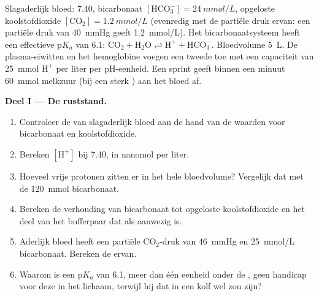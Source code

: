 \begin{problem}
\label{pb:b1:water-small-molecules:1}
Slagaderlijk bloed:  7.40, bicarbonaat $[\mathrm{HCO_3^-}] =
\qty{24}{mmol/L}$, opgeloste koolstofdioxide $[\mathrm{CO_2}] =
\qty{1.2}{mmol/L}$ (evenredig met de partiële druk ervan: een partiële druk van
\qty{40}{mmHg} geeft \qty{1.2}{mmol/L}). Het bicarbonaatsysteem heeft een
effectieve p$K_a$ van 6.1: $\mathrm{CO_2} + \mathrm{H_2O}
\rightleftharpoons \mathrm{H^+} + \mathrm{HCO_3^-}$. Bloedvolume \qty{5}{L}. De
plasma-eiwitten en het hemoglobine voegen een tweede  toe met een
capaciteit van \qty{25}{mmol} $\mathrm{H^+}$ per liter per pH-eenheid. Een sprint
geeft binnen een minuut \qty{60}{mmol} melkzuur (bij  een sterk ) aan
het bloed af.

\medskip
\noindent\textbf{Deel I --- De ruststand.}
\begin{enumerate}
  \item Controleer de  van slagaderlijk bloed aan de hand van de waarden
        voor bicarbonaat en koolstofdioxide.
  \item Bereken $[\mathrm{H^+}]$ bij  7.40, in nanomol per liter.
  \item Hoeveel vrije protonen zitten er in het hele bloedvolume?
        Vergelijk dat met de \qty{120}{mmol} bicarbonaat.
  \item Bereken de verhouding van bicarbonaat tot opgeloste
        koolstofdioxide en het deel van het bufferpaar dat als 
        aanwezig is.
  \item Aderlijk bloed heeft een partiële $\mathrm{CO_2}$-druk van
        \qty{46}{mmHg} en \qty{25}{mmol/L} bicarbonaat. Bereken de 
        ervan.
  \item Waarom is een p$K_a$ van 6.1, meer dan één eenheid onder de
        , geen handicap voor deze  in het lichaam, terwijl
        hij dat in een kolf wel zou zijn?
\end{enumerate}


\end{problem}
